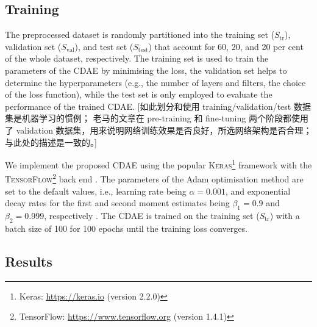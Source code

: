\documentclass[letters,fleqn,usenatbib,onecolumn]{mnras}
\newcommand{\R}[1]{\mathrm{#1}}
\begin{document}
\subsection{Training}
\label{sec:training}

The preprocessed dataset is randomly partitioned into the
training set ($S_{\R{tr}}$), validation set ($S_{\R{val}}$),
and test set ($S_{\R{test}}$) that account for
60, 20, and 20 per cent of the whole dataset, respectively.
The training set is used to train the parameters of the CDAE by
minimising the loss,
the validation set helps to determine the hyperparameters (e.g., the
number of layers and filters, the choice of the loss function),
while the test set is only employed to evaluate the performance of the
trained CDAE.
[如此划分和使用 training/validation/test 数据集是机器学习的惯例；
老马的文章在 pre-training 和 fine-tuning 两个阶段都使用了
validation 数据集，用来说明网络训练效果是否良好，所选网络架构是否合理；
与此处的描述是一致的。]

We implement the proposed CDAE using the popular \textsc{Keras}\footnote{%
  Keras: \url{https://keras.io} (version 2.2.0)}
framework \citep{keras} with the \textsc{TensorFlow}\footnote{%
TensorFlow: \url{https://www.tensorflow.org} (version 1.4.1)}
back end \citep{tensorflow}.
The parameters of the Adam optimisation method are set to the default
values, i.e., learning rate being $\alpha = 0.001$, and
exponential decay rates for the first and second moment estimates being
$\beta_1 = 0.9$ and $\beta_2 = 0.999$, respectively \citep{kingma2015}.
The CDAE is trained on the training set ($S_{\R{tr}}$) with a batch size
of 100 for 100 epochs until the training loss converges.


\subsection{Results}
\label{sec:results}
\end{document}
